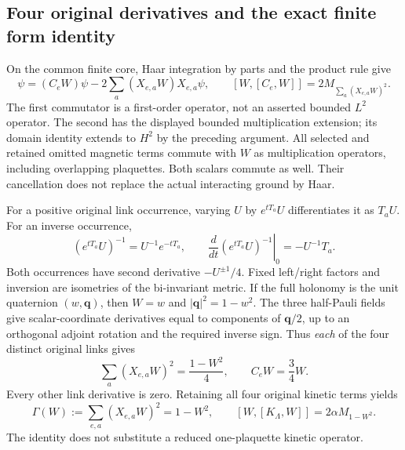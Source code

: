 \subsection{Four original derivatives and the exact finite form identity}
On the common finite core, Haar integration by parts and the product rule give
\begin{equation}
 [C_e,W]\psi=(C_eW)\psi-2\sum_a(X_{e,a}W)X_{e,a}\psi,
 \qquad[W,[C_e,W]]=2M_{\sum_a(X_{e,a}W)^2}.
 \label{r28:eq:ak2-double}
\end{equation}
The first commutator is a first-order operator, not an asserted bounded $L^2$ operator. The second has the displayed bounded multiplication extension; its domain identity extends to $H^2$ by the preceding argument. All selected and retained omitted magnetic terms commute with $W$ as multiplication operators, including overlapping plaquettes. Both scalars commute as well. Their cancellation does not replace the actual interacting ground by Haar.

For a positive original link occurrence, varying $U$ by $e^{tT_a}U$ differentiates it as $T_aU$. For an inverse occurrence,
\begin{equation}
 (e^{tT_a}U)^{-1}=U^{-1}e^{-tT_a},\qquad
 \left.\frac d{dt}(e^{tT_a}U)^{-1}\right|_{0}=-U^{-1}T_a.
 \label{r28:eq:ak2-inverse}
\end{equation}
Both occurrences have second derivative $-U^{\pm1}/4$. Fixed left/right factors and inversion are isometries of the bi-invariant metric. If the full holonomy is the unit quaternion $(w,\mathbf q)$, then $W=w$ and $|\mathbf q|^2=1-w^2$. The three half-Pauli fields give scalar-coordinate derivatives equal to components of $\mathbf q/2$, up to an orthogonal adjoint rotation and the required inverse sign. Thus \emph{each} of the four distinct original links gives
\begin{equation}
 \sum_a(X_{e,a}W)^2=\frac{1-W^2}{4},\qquad C_eW=\frac34W.
\end{equation}
Every other link derivative is zero. Retaining all four original kinetic terms yields
\begin{equation}
 \Gamma(W):=\sum_{e,a}(X_{e,a}W)^2=1-W^2,
 \qquad[W,[K_\Lambda,W]]=2\alpha M_{1-W^2}.
 \label{r28:eq:ak2-gradient}
\end{equation}
The identity does not substitute a reduced one-plaquette kinetic operator.

